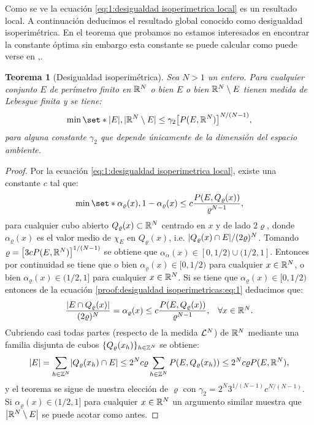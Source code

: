\documentclass[a4paper,11pt,spanish, twoside, leqno]{tfm-uam}
\newtheorem{teo}{Teorema}[chapter]
\begin{document}
Como se ve la ecuación \ref{eq:1:desigualdad isoperimetrica local} es un resultado local. A continuación deducimos el resultado global conocido como desigualdad isoperimétrica. En el teorema que probamos no estamos interesados en encontrar la constante óptima sin embargo esta constante se puede calcular como puede verse en \cite{talenti1976best},\cite{de1958sulla}.
\begin{teo}[Desigualdad isoperimétrica]\label{teo:desigualdad isoperimetrica} 
Sea $N>1$ un entero. Para cualquier conjunto $E$ de perímetro finito en $\R^{N}$ o bien $E$ o bien $\R^{N}\setminus E$ tienen medida de Lebesgue finita y se tiene: 
\begin{align*}
\min\set*{\abs{E}, \abs{\R^{N}\setminus E}}\leq \gamma_{2}\br*{P(E,\R^{N})}^{N/(N-1)},
\end{align*}
para alguna constante $\gamma_{2}$ que depende únicamente de la dimensión del espacio ambiente.
\end{teo}
\begin{proof}
Por la ecuación \ref{eq:1:desigualdad isoperimetrica local}, existe una constante $c$ tal que:
\begin{align}\label{proof:desigualdad isoperimetricas:eq:1}
\min\set*{\alpha_{\varrho}(x), 1-\alpha_{\varrho}(x)}\leq c\dfrac{P(E, Q_{\varrho}(x))}{\varrho^{N-1}},
\end{align}
para cualquier cubo abierto $Q_{\varrho}(x)\subset \R^{N}$ centrado en $x$ y de lado $2\varrho$, donde $\alpha_{\varrho}(x)$ es el valor medio de $\chi_{E}$ en $Q_{\varrho}(x)$, i.e. $\abs{Q_{\varrho}(x)\cap E}/(2\varrho)^{N}$. Tomando $\varrho=\br*{3cP(E, \R^{N})}^{1/(N-1)}$  se obtiene que $\alpha_{\alpha}(x)\in[0, 1/2)\cup (1/2, 1]$. Entonces por continuidad se tiene que o bien $\alpha_{\varrho}(x)\in [0, 1/2)$ para cualquier $x\in \R^{N}$, o bien $\alpha_{\varrho}(x)\in (1/2, 1]$ para cualquier $x\in \R^{N}$. Si se tiene que $\alpha_{\varrho}(x)\in [0, 1/2)$ entonces de la ecuación \ref{proof:desigualdad isoperimetricas:eq:1} deducimos que:
\begin{align*}
\begin{array}{ll}
\displaystyle \dfrac{\abs*{E\cap Q_{\varrho}(x)}}{(2\varrho)^{N}}=\alpha_{\varrho}(x)\leq c\dfrac{P(E, Q_{\varrho}(x))}{\varrho^{N-1}}, & \forall x\in \R^{N}.
\end{array}
\end{align*}
Cubriendo casi todas partes (respecto de la medida $\Lm{N}$) de $\R^{N}$ mediante una familia disjunta de cubos $\{Q_{\varrho}(x_{h})\}_{h\in\Z^{N}}$ se obtiene:
\begin{align*}
\abs*{E}=\sum_{h\in\Z^{N}}\abs*{Q_{\varrho}(x_{h})\cap E} \leq 2^{N}c\varrho\sum_{h\in\Z^{N}}P(E, Q_{\varrho}(x_{h}))\leq 2^{N}c\varrho P(E, \R^{N}),
\end{align*}
y el teorema se sigue de nuestra elección de $\varrho$ con $\gamma_{2}=2^{N}3^{1/(N-1)}c^{N/(N-1)}$. Si $\alpha_{\varrho}(x)\in (1/2, 1]$ para cualquier $x\in \R^{N}$ un argumento similar muestra que $\abs*{\R^{N}\setminus E}$ se puede acotar como antes.
\end{proof}
\end{document}
